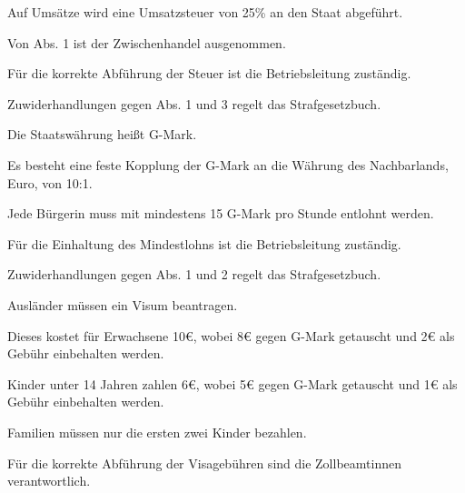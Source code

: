 \documentclass{sasbase}
\begin{document}
\begin{lawparagraph}[Umsatzsteuer]
    \item Auf Umsätze wird eine Umsatzsteuer von 25\% an den Staat abgeführt.
    \item Von Abs. 1 ist der Zwischenhandel ausgenommen.
    \item Für die korrekte Abführung der Steuer ist die Betriebsleitung zuständig.
    \item Zuwiderhandlungen gegen Abs. 1 und 3 regelt das Strafgesetzbuch.
\end{lawparagraph}

\begin{lawparagraph}[Währung]
    \item Die Staatswährung heißt G-Mark.
    \item Es besteht eine feste Kopplung der G-Mark an die Währung des Nachbarlands, Euro, von 10:1.
\end{lawparagraph}

\begin{lawparagraph}[Mindestlohn]
    \item Jede Bürgerin muss mit mindestens 15 G-Mark pro Stunde entlohnt werden.
    \item Für die Einhaltung des Mindestlohns ist die Betriebsleitung zuständig.
    \item Zuwiderhandlungen gegen Abs. 1 und 2 regelt das Strafgesetzbuch.
\end{lawparagraph}

\begin{lawparagraph}
    \item Ausländer müssen ein Visum beantragen.
    \item Dieses kostet für Erwachsene 10€, wobei 8€ gegen G-Mark getauscht und 2€ als Gebühr
        einbehalten werden.
    \item Kinder unter 14 Jahren zahlen 6€, wobei 5€ gegen G-Mark getauscht und 1€ als Gebühr
        einbehalten werden.
    \item Familien müssen nur die ersten zwei Kinder bezahlen.
    \item Für die korrekte Abführung der Visagebühren sind die Zollbeamtinnen verantwortlich.
\end{lawparagraph}
\end{document}
